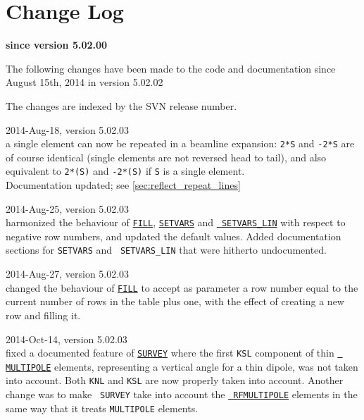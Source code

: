 \chapter{Change Log}
\label{chap:changelog}

\begin{center} 
\textbf{since version 5.02.00}
\end{center}

The following changes have been made to the code and documentation since
August 15th, 2014 in version 5.02.02

The changes are indexed by the SVN release number. 

\begin{madlist}

   2014-Aug-18, version 5.02.03 \\
  a single element can now be repeated in a beamline expansion:
  \texttt{2*S} and \texttt{-2*S} are of course identical (single
  elements are not reversed head to tail), and also equivalent to
  \texttt{2*(S)} and \texttt{-2*(S)} if \texttt{S} is a single
  element.\\
  Documentation updated; see \ref{sec:reflect_repeat_lines}


   2014-Aug-25, version 5.02.03 \\
  harmonized the behaviour of \hyperref[sec:fill]{\tt FILL},
  \hyperref[sec:setvars]{\tt SETVARS} and \hyperref[sec:setvars_lin]{\tt
    SETVARS\_LIN} with respect to negative row numbers, and updated the
  default values. Added documentation sections for {\tt SETVARS} and {\tt
    SETVARS\_LIN} that were hitherto undocumented.  


   2014-Aug-27, version 5.02.03 \\
  changed the behaviour of \hyperref[sec:fill]{\tt FILL} to accept as
  parameter a row number equal to the current number of rows in the
  table plus one, with the effect of creating a new row and filling it. 


   2014-Oct-14, version 5.02.03\\
  fixed a documented feature of \hyperref[chap:survey]{\tt SURVEY} where
  the first {\tt KSL} component of thin \hyperref[sec:multipole]{\tt
    MULTIPOLE} elements, representing a vertical angle for a thin
  dipole, was not taken into account. Both {\tt KNL} and {\tt KSL} are
  now properly taken into account. Another change was to make {\tt
    SURVEY} take into account the \hyperref[sec:rfmultipole]{\tt
    RFMULTIPOLE} elements in the same way that it treats {\tt MULTIPOLE}
  elements.
  


\end{madlist}
